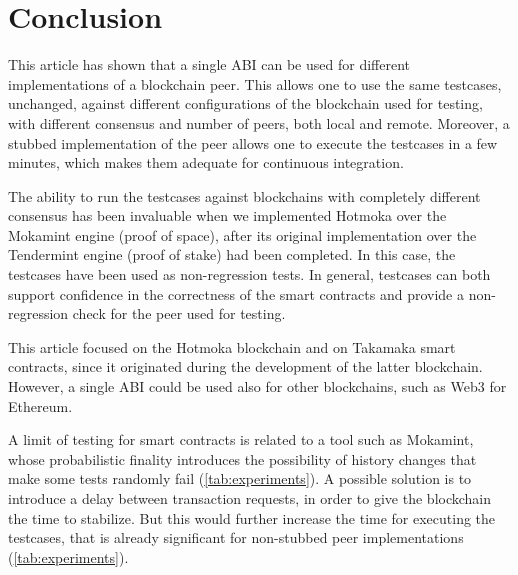 \section{Conclusion}\label{sec:conclusion}

This article has shown that a single ABI
can be used for different implementations of a blockchain peer.
This allows one to use the same testcases, unchanged, against different
configurations of the blockchain used for testing, with different consensus
and number of peers, both local and remote. Moreover, a stubbed implementation
of the peer allows one to execute the testcases in a few minutes, which
makes them adequate for continuous integration.

The ability to run the testcases against blockchains with completely
different consensus has been invaluable when we implemented
Hotmoka over the Mokamint engine (proof of space), after its
original implementation over the Tendermint engine (proof of stake) had been completed.
In this case, the testcases have been used as non-regression tests.
In general, testcases can both support confidence in the
correctness of the smart contracts and provide a non-regression check for the
peer used for testing.

This article focused on the Hotmoka blockchain and on Takamaka smart contracts,
since it originated during the development of the latter blockchain.
However, a single ABI could be used also for other blockchains, such as Web3 for Ethereum.

A limit of testing for smart contracts is related to a tool such as Mokamint,
whose probabilistic finality introduces the possibility of
history changes that make some tests randomly fail (\cref{tab:experiments}).
A possible solution is to introduce a delay between transaction requests,
in order to give the blockchain the time to stabilize. But this would
further increase the time for executing the testcases, that is already significant
for non-stubbed peer implementations (\cref{tab:experiments}).
